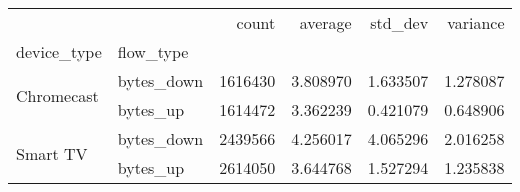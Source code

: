 \begin{tabular}{llrrrr}
\toprule
 &  & count & average & std_dev & variance \\
device_type & flow_type &  &  &  &  \\
\midrule
\multirow[t]{2}{*}{Chromecast} & bytes_down & 1616430 & 3.808970 & 1.633507 & 1.278087 \\
 & bytes_up & 1614472 & 3.362239 & 0.421079 & 0.648906 \\
\cline{1-6}
\multirow[t]{2}{*}{Smart TV} & bytes_down & 2439566 & 4.256017 & 4.065296 & 2.016258 \\
 & bytes_up & 2614050 & 3.644768 & 1.527294 & 1.235838 \\
\cline{1-6}
\bottomrule
\end{tabular}
